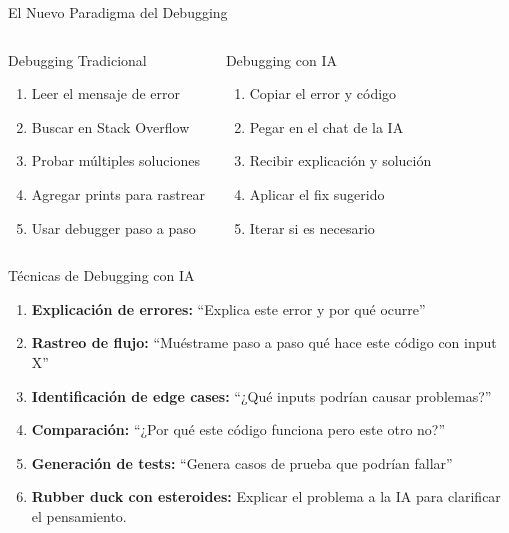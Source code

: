 \documentclass[aspectratio=169]{beamer}
\begin{document}
\begin{frame}{El Nuevo Paradigma del Debugging}
    \begin{columns}[t]
        \begin{alertblock}{Debugging Tradicional}
            \begin{enumerate}
                \item Leer el mensaje de error
                \item Buscar en Stack Overflow
                \item Probar múltiples soluciones
                \item Agregar prints para rastrear
                \item Usar debugger paso a paso
            \end{enumerate}
        \end{alertblock}
        
        \begin{exampleblock}{Debugging con IA}
            \begin{enumerate}
                \item Copiar el error y código
                \item Pegar en el chat de la IA
                \item Recibir explicación y solución
                \item Aplicar el fix sugerido
                \item Iterar si es necesario
            \end{enumerate}
        \end{exampleblock}
    \end{columns}
\end{frame}

\begin{frame}{Técnicas de Debugging con IA}
    \begin{enumerate}
        \setlength\itemsep{0.7em}
        \item \textbf{Explicación de errores:} ``Explica este error y por qué ocurre''
        
        \item \textbf{Rastreo de flujo:} ``Muéstrame paso a paso qué hace este código con input X''
        
        \item \textbf{Identificación de edge cases:} ``¿Qué inputs podrían causar problemas?''
        
        \item \textbf{Comparación:} ``¿Por qué este código funciona pero este otro no?''
        
        \item \textbf{Generación de tests:} ``Genera casos de prueba que podrían fallar''
        
        \item \textbf{Rubber duck con esteroides:} Explicar el problema a la IA para clarificar el pensamiento.
    \end{enumerate}
\end{frame}
\end{document}
